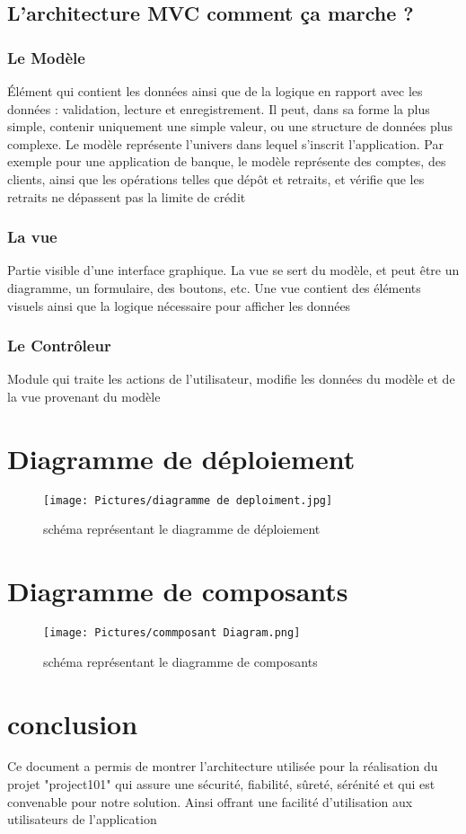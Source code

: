 \documentclass[11pt,fleqn]{book} %
\begin{document}
\subsection{L’architecture MVC comment ça marche ?}
\subsubsection{Le Modèle}
Élément qui contient les données ainsi que de la logique en rapport avec les données : validation, lecture et enregistrement. Il peut, dans sa forme la plus simple, contenir uniquement une simple valeur, ou une structure de données plus complexe. Le modèle représente l'univers dans lequel s'inscrit l'application. Par exemple pour une application de banque, le modèle représente des comptes, des clients, ainsi que les opérations telles que dépôt et retraits, et vérifie que les retraits ne dépassent pas la limite de crédit
\subsubsection{La vue}
Partie visible d'une interface graphique. La vue se sert du modèle, et peut être un diagramme, un formulaire, des boutons, etc. Une vue contient des éléments visuels ainsi que la logique nécessaire pour afficher les données
\subsubsection{Le Contrôleur}
Module qui traite les actions de l'utilisateur, modifie les données du modèle et de la vue
 provenant du modèle
 \newpage
\section{Diagramme de déploiement}
\vspace{5em}
\begin{figure}[h]
    \centering
    \texttt{[image: Pictures/diagramme de deploiment.jpg]}
        \caption{schéma représentant le diagramme de déploiement}
\end{figure}
\newpage
\section{ Diagramme de composants}
\begin{figure}[h]
    \centering
    \texttt{[image: Pictures/commposant Diagram.png]}
    \caption{schéma représentant le diagramme de composants}
\end{figure}
\section{conclusion}
Ce document a permis de montrer l’architecture utilisée pour la réalisation du projet "project101" qui assure une sécurité, fiabilité, sûreté, sérénité et qui est convenable pour notre solution. Ainsi offrant une facilité d’utilisation aux utilisateurs de l’application

\listoffigures
\end{document}
